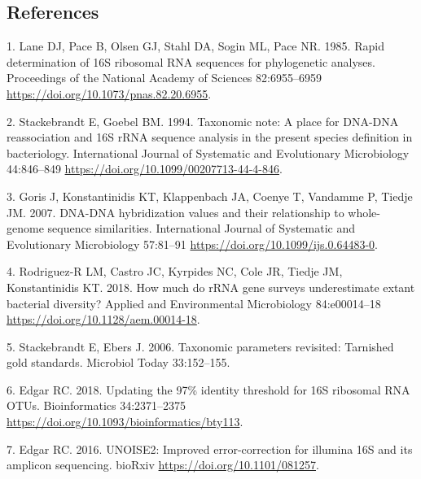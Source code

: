 \documentclass[
]{article}
\newenvironment{cslreferences}%
  {}%
  {\par}
\begin{document}
\newpage

\hypertarget{references}{%
\subsection{References}\label{references}}

\setlength{\parindent}{-0.25in}
\setlength{\leftskip}{0.25in}

\noindent

\hypertarget{refs}{}
\begin{cslreferences}
\leavevmode\hypertarget{ref-Lane1985}{}%
1. Lane DJ, Pace B, Olsen GJ, Stahl DA, Sogin ML, Pace NR. 1985. Rapid
determination of 16S ribosomal RNA sequences for phylogenetic analyses.
Proceedings of the National Academy of Sciences 82:6955--6959
\url{https://doi.org/10.1073/pnas.82.20.6955}.

\leavevmode\hypertarget{ref-Stackebrandt1994}{}%
2. Stackebrandt E, Goebel BM. 1994. Taxonomic note: A place for DNA-DNA
reassociation and 16S rRNA sequence analysis in the present species
definition in bacteriology. International Journal of Systematic and
Evolutionary Microbiology 44:846--849
\url{https://doi.org/10.1099/00207713-44-4-846}.

\leavevmode\hypertarget{ref-Goris2007}{}%
3. Goris J, Konstantinidis KT, Klappenbach JA, Coenye T, Vandamme P,
Tiedje JM. 2007. DNA-DNA hybridization values and their relationship to
whole-genome sequence similarities. International Journal of Systematic
and Evolutionary Microbiology 57:81--91
\url{https://doi.org/10.1099/ijs.0.64483-0}.

\leavevmode\hypertarget{ref-RodriguezR2018}{}%
4. Rodriguez-R LM, Castro JC, Kyrpides NC, Cole JR, Tiedje JM,
Konstantinidis KT. 2018. How much do rRNA gene surveys underestimate
extant bacterial diversity? Applied and Environmental Microbiology
84:e00014--18 \url{https://doi.org/10.1128/aem.00014-18}.

\leavevmode\hypertarget{ref-Stackebrandt2006}{}%
5. Stackebrandt E, Ebers J. 2006. Taxonomic parameters revisited:
Tarnished gold standards. Microbiol Today 33:152--155.

\leavevmode\hypertarget{ref-Edgar2018}{}%
6. Edgar RC. 2018. Updating the 97\% identity threshold for 16S
ribosomal RNA OTUs. Bioinformatics 34:2371--2375
\url{https://doi.org/10.1093/bioinformatics/bty113}.

\leavevmode\hypertarget{ref-Edgar2016}{}%
7. Edgar RC. 2016. UNOISE2: Improved error-correction for illumina 16S
and its amplicon sequencing. bioRxiv
\url{https://doi.org/10.1101/081257}.


\end{cslreferences}
\end{document}
